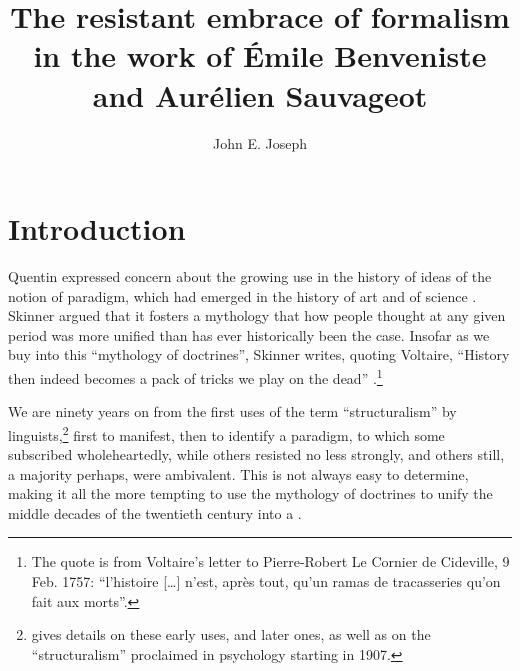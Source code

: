 \documentclass[output=paper]{langscibook}
\author{John E. Joseph \affiliation{University of Edinburgh}}
\title{The resistant embrace of formalism in the work of Émile Benveniste and Aurélien Sauvageot}
\begin{document}
\maketitle

\section{Introduction}
\label{sec:joseph:intro}

Quentin \citet{Skinner1969} expressed concern about the growing use in the history of ideas of the notion of paradigm, which had emerged in the history of art \citep{Gombrich1960} and of science \citep{Kuhn1962}. Skinner argued that it fosters a mythology that how people thought at any given period was more unified than has ever historically been the case. Insofar as we buy into this ``mythology of doctrines'', Skinner writes, quoting Voltaire, ``History then indeed becomes a pack of tricks we play on the dead'' \citep[7, 13--14]{Skinner1969}.\footnote{The quote is from Voltaire's letter to Pierre-Robert Le Cornier de Cideville, 9 Feb. 1757: ``l'histoire […] n'est, après tout, qu'un ramas de tracasseries qu'on fait aux morts''.} 

We are ninety years on from the first uses of the term ``structuralism'' by linguists,\footnote{\citet{Joseph2001} gives details on these early uses, and later ones, as well as on the ``structuralism'' proclaimed in psychology starting in 1907.} first to manifest, then to identify a paradigm, to which some subscribed wholeheartedly, while others resisted no less strongly, and others still, a majority perhaps, were ambivalent. This is not always easy to determine, making it all the more tempting to use the mythology of doctrines to unify the middle decades of the twentieth century into a .
\end{document}
